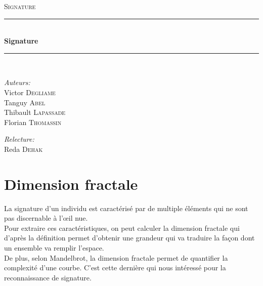 \documentclass[pdftex,12pt,a4paper]{report}
\newcommand{\HRule}{\rule{\linewidth}{0.5mm}}
\begin{document}
\begin{titlepage}
\begin{center}
\textsc{\LARGE Signature}\\[1.5cm]

\HRule \\[0.4cm]
{\huge \bfseries Signature}\\[0.4cm]
\HRule \\[1.5cm]
\end{center}

\begin{minipage}{0.4\textwidth}
	\begin{flushleft} \large
		\emph{Auteurs:}\\
			Victor \textsc{Degliame} \\
			Tanguy \textsc{Abel} \\
			Thibault \textsc{Lapassade} \\
			Florian \textsc{Thomassin} \\
	\end{flushleft}
\end{minipage}
\begin{minipage}{0.4\textwidth}
	\begin{flushright} \large
		\emph{Relecture:} \\
              Reda \textsc{Dehak}
	\end{flushright}
\end{minipage}
\end{titlepage}

\tableofcontents

\newpage

\chapter{Dimension fractale}
La signature d'un individu est caractérisé par de multiple éléments qui ne sont pas discernable à l'œil nue.\\

Pour extraire ces caractéristiques, on peut calculer la dimension fractale qui d'après la définition permet d'obtenir une grandeur qui va traduire la façon dont un ensemble va remplir l'espace.\\

De plus, selon Mandelbrot, la dimension fractale permet de quantifier la complexité d'une courbe. C'est cette dernière qui nous intéressé pour la reconnaissance de signature.\\
\end{document}
